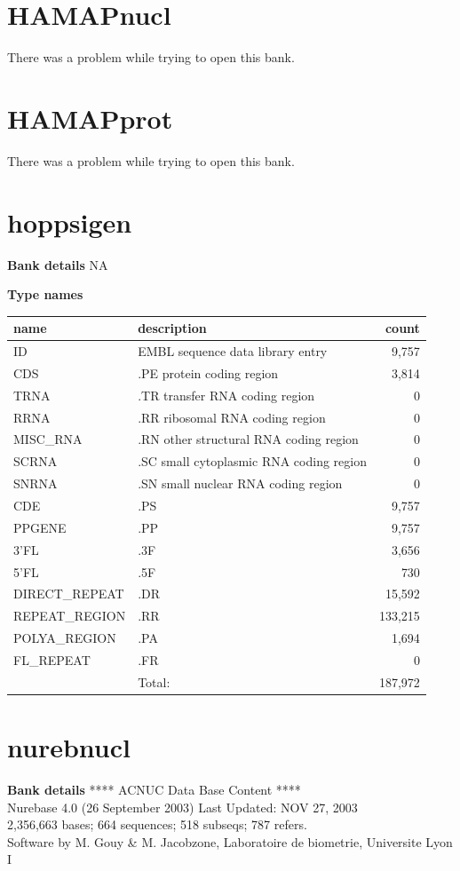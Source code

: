 \documentclass{article}
\begin{document}
\begin{Schunk}
\section{ HAMAPnucl }
There was a problem while trying to open this bank.
\section{ HAMAPprot }
There was a problem while trying to open this bank.
\section{ hoppsigen }
\textbf{Bank details}
NA

\textbf{Type names}
\noindent\begin{tabular}{llr}
\hline \hline
name & description & count \\
\hline
ID  &  EMBL sequence data library entry  &  9,757 \\
CDS  &  .PE protein coding region  &  3,814 \\
TRNA  &  .TR transfer RNA coding region  &  0 \\
RRNA  &  .RR ribosomal RNA coding region  &  0 \\
MISC\_RNA  &  .RN other structural RNA coding region  &  0 \\
SCRNA  &  .SC small cytoplasmic RNA coding region  &  0 \\
SNRNA  &  .SN small nuclear RNA coding region  &  0 \\
CDE  &  .PS  &  9,757 \\
PPGENE  &  .PP  &  9,757 \\
3'FL  &  .3F  &  3,656 \\
5'FL  &  .5F  &  730 \\
DIRECT\_REPEAT  &  .DR  &  15,592 \\
REPEAT\_REGION  &  .RR  &  133,215 \\
POLYA\_REGION  &  .PA  &  1,694 \\
FL\_REPEAT  &  .FR  &  0 \\
\hline
 & Total: & 187,972 \\
\hline \hline
\end{tabular}

\section{ nurebnucl }
\textbf{Bank details}
             ****     ACNUC Data Base Content      ****                         \\
         Nurebase 4.0 (26 September 2003) Last Updated: NOV 27, 2003\\
2,356,663 bases; 664 sequences; 518 subseqs; 787 refers.\\
Software by M. Gouy \& M. Jacobzone, Laboratoire de biometrie, Universite Lyon I 


\end{Schunk}
\end{document}
